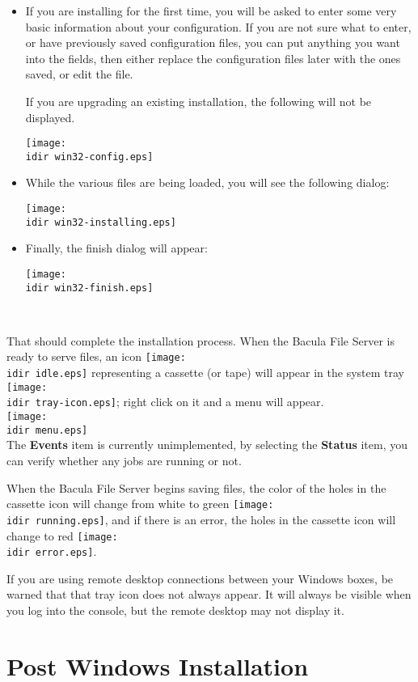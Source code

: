 \begin{itemize}
\item If you are installing for the first time, you will  be asked to
   enter some very basic information about your configuration. If
   you are not sure what to enter, or have previously saved configuration
   files, you can put anything you want into the fields, then either
   replace the configuration files later with the ones saved, or edit
   the file.

   If you are upgrading an existing installation, the following will
   not be displayed.


\texttt{[image: \\idir win32-config.eps]}  
 
\item While the various files are being loaded, you will see the following
   dialog:

   \texttt{[image: \\idir win32-installing.eps]}  


\item Finally, the finish dialog will appear:  

   \texttt{[image: \\idir win32-finish.eps]}  

\ 
\end{itemize}

That should complete the installation process. When the Bacula File Server is
ready to serve files, an icon \texttt{[image: \\idir idle.eps]} representing a
cassette (or tape) will appear in the system tray
\texttt{[image: \\idir tray-icon.eps]}; right click on it and a menu will appear.\\
\texttt{[image: \\idir menu.eps]}\\
The {\bf Events} item is currently unimplemented, by selecting the {\bf
Status} item, you can verify whether any jobs are running or not. 

When the Bacula File Server begins saving files, the color of the holes in the
cassette icon will change from white to green \texttt{[image: \\idir running.eps]},
and if there is an error, the holes in the cassette icon will change to red
\texttt{[image: \\idir error.eps]}. 

If you are using remote desktop connections between your Windows boxes, be
warned that that tray icon does not always appear. It will always be visible
when you log into the console, but the remote desktop may not display it. 

\section{Post Windows Installation}

